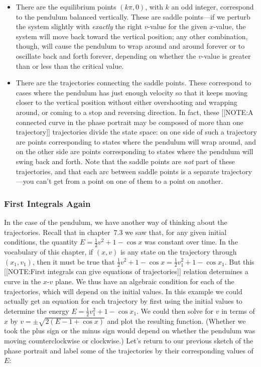 \begin{itemize}
\item There are the equilibrium points $(k\pi, 0)$, with $k$ an odd
  integer, correspond to the pendulum balanced vertically. These are
  saddle points---if we perturb the system slightly with {\em
    exactly\/} the right $v$-value for the given $x$-value, the system
  will move back toward the vertical position; any other combination,
  though, will cause the pendulum to wrap around and around forever or
  to oscillate back and forth forever, depending on whether the
  $v$-value is greater than or less than the critical value.

\item There are the trajectories connecting the saddle points.  These
  correspond to cases where the pendulum has just enough velocity so
  that it keeps moving closer to the vertical position without either
  overshooting and wrapping around, or coming to a stop and reversing
  direction.  In fact, these [[NOTE:A connected curve in the phase
    portrait may be composed of more than one trajectory]] trajectories
  divide the state space: on one side of such a trajectory are points
  corresponding to states where the pendulum will wrap around, and on
  the other side are points corresponding to states where the pendulum
  will swing back and forth. Note that the saddle points are {\em
    not\/} part of these trajectories, and that each arc between
  saddle points is a separate trajectory---you can't get from a point
  on one of them to a point on another.
\end{itemize}

\subsubsection{First Integrals Again}
\label{subsubsec:first-integrals-again}

In the case of the pendulum, we have another way of thinking about the
trajectories.  Recall that in chapter~7.3 we saw that, for any
given initial conditions, the quantity $E = \tfrac{1}{2} v^2 + 1 -
\cos{x}$ was constant over time.  In the vocabulary of this chapter,
if $(x, v)$ is any state on the trajectory through $(x_1, v_1)$, then
it must be true that $\tfrac{1}{2} v^2 + 1 - \cos{x} = \tfrac{1}{2}
v_1^2 + 1 - \cos{x_1}$.  But this
[[NOTE:First integrals  can give equations  of trajectories]]
relation determines a curve in the $x$-$v$ plane.  We thus have an
algebraic condition for each of the trajectories, which will depend on
the initial values.  In this example we could actually get an equation
for each trajectory by first using the initial values to determine the
energy $E = \tfrac{1}{2} v_1^2 + 1 - \cos{x_1}$.  We could then solve
for $v$ in terms of $x$ by $v=\pm \sqrt{2(E-1+\cos{x})}$ and plot the
resulting function. (Whether we took the plus sign or the minus sign
would depend on whether the pendulum was moving counterclockwise or
clockwise.)  Let's return to our previous sketch of the phase portrait
and label some of the trajectories by their corresponding values of
$E$:

